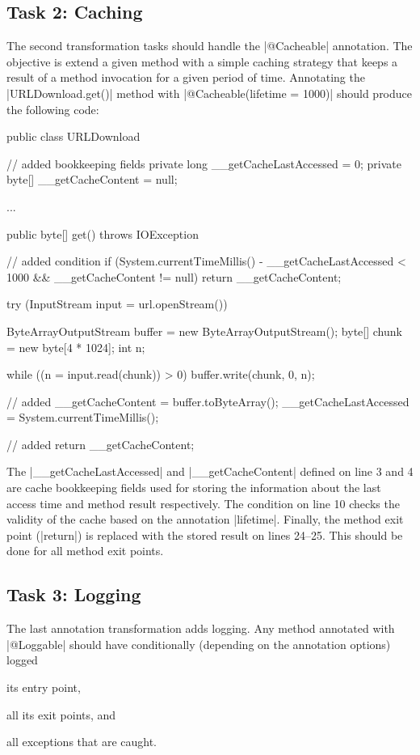 \subsection{Task 2: Caching}

The second transformation tasks should handle the \javainline|@Cacheable| annotation.
The objective is extend a given method with a simple caching strategy that keeps a result of a method invocation for a given period of time.
Annotating the \javainline|URLDownload.get()| method with \javainline|@Cacheable(lifetime = 1000)| should produce the following code:
%
\begin{javacode}
public class URLDownload {
  // added bookkeeping fields
  private long __getCacheLastAccessed = 0;
  private byte[] __getCacheContent = null;

  ...

  public byte[] get() throws IOException {
    // added condition
    if (System.currentTimeMillis() - __getCacheLastAccessed < 1000 && __getCacheContent != null) {
      return __getCacheContent;
    }

    try (InputStream input = url.openStream()) {
      ByteArrayOutputStream buffer = new ByteArrayOutputStream();
      byte[] chunk = new byte[4 * 1024];
      int n;

      while ((n = input.read(chunk)) > 0) {
        buffer.write(chunk, 0, n);
      }

      // added
      __getCacheContent = buffer.toByteArray();
      __getCacheLastAccessed = System.currentTimeMillis();
      
      // added
      return __getCacheContent;
    }
  }
}
\end{javacode}

The \javainline|__getCacheLastAccessed| and \javainline|__getCacheContent| defined on line 3 and 4 are cache bookkeeping fields used for storing the information about the last access time and method result respectively.
The condition on line 10 checks the validity of the cache based on the annotation \javainline|lifetime|.
Finally, the method exit point (\javainline|return|) is replaced with the stored result on lines 24--25.
This should be done for all method exit points.

\subsection{Task 3: Logging}

The last annotation transformation adds logging.
Any method annotated with \javainline|@Loggable| should have conditionally (depending on the annotation options) logged
\begin{inparaenum}[(i)]
\item its entry point, 
\item all its exit points, and 
\item all exceptions that are caught. 
\end{inparaenum}

